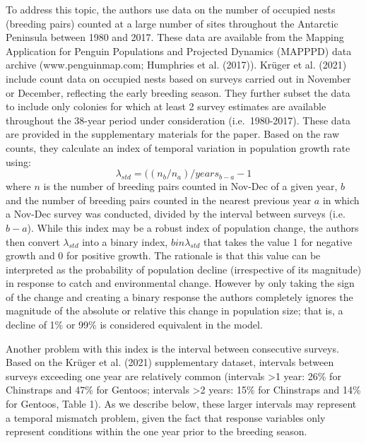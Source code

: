 \documentclass[]{elsarticle} %
\begin{document}
To address this topic, the authors use data on the number of occupied
nests (breeding pairs) counted at a large number of sites throughout the
Antarctic Peninsula between 1980 and 2017. These data are available from
the Mapping Application for Penguin Populations and Projected Dynamics
(MAPPPD) data archive (www.penguinmap.com; Humphries et al. (2017)).
Krüger et al. (2021) include count data on occupied nests based on
surveys carried out in November or December, reflecting the early
breeding season. They further subset the data to include only colonies
for which at least 2 survey estimates are available throughout the
38-year period under consideration (i.e.~1980-2017). These data are
provided in the supplementary materials for the paper. Based on the raw
counts, they calculate an index of temporal variation in population
growth rate using: \[\lambda_{std}=((n_b/n_a)/years_{b-a}-1\] where
\(n\) is the number of breeding pairs counted in Nov-Dec of a given
year, \(b\) and the number of breeding pairs counted in the nearest
previous year \(a\) in which a Nov-Dec survey was conducted, divided by
the interval between surveys (i.e.~\(b-a\)). While this index may be a
robust index of population change, the authors then convert
\(\lambda_{std}\) into a binary index, \(bin\lambda_{std}\) that takes
the value 1 for negative growth and 0 for positive growth. The rationale
is that this value can be interpreted as the probability of population
decline (irrespective of its magnitude) in response to catch and
environmental change. However by only taking the sign of the change and
creating a binary response the authors completely ignores the magnitude
of the absolute or relative this change in population size; that is, a
decline of 1\% or 99\% is considered equivalent in the model.

Another problem with this index is the interval between consecutive
surveys. Based on the Krüger et al. (2021) supplementary dataset,
intervals between surveys exceeding one year are relatively common
(intervals \textgreater1 year: 26\% for Chinstraps and 47\% for Gentoos;
intervals \textgreater2 years: 15\% for Chinstraps and 14\% for Gentoos,
Table 1). As we describe below, these larger intervals may represent a
temporal mismatch problem, given the fact that response variables only
represent conditions within the one year prior to the breeding season.
\end{document}
